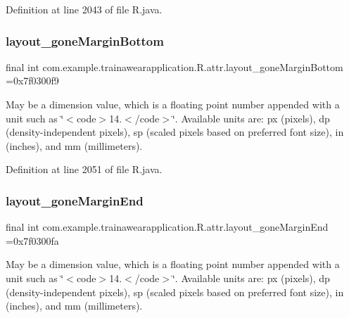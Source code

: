 Definition at line 2043 of file R.\+java.

\mbox{\label{classcom_1_1example_1_1trainawearapplication_1_1_r_1_1attr_af7ede1e194a5d45714927c5b07c3c7b1}} 
\subsubsection{\texorpdfstring{layout\_goneMarginBottom}{layout\_goneMarginBottom}}
{\footnotesize\ttfamily final int com.\+example.\+trainawearapplication.\+R.\+attr.\+layout\+\_\+gone\+Margin\+Bottom =0x7f0300f9\hspace{0.3cm}{\ttfamily [static]}}

May be a dimension value, which is a floating point number appended with a unit such as \char`\"{}$<$code$>$14.\+5sp$<$/code$>$\char`\"{}. Available units are\+: px (pixels), dp (density-\/independent pixels), sp (scaled pixels based on preferred font size), in (inches), and mm (millimeters). 

Definition at line 2051 of file R.\+java.

\mbox{\label{classcom_1_1example_1_1trainawearapplication_1_1_r_1_1attr_a74071c7b63cbbee66d73c874ad80cfe9}} 
\subsubsection{\texorpdfstring{layout\_goneMarginEnd}{layout\_goneMarginEnd}}
{\footnotesize\ttfamily final int com.\+example.\+trainawearapplication.\+R.\+attr.\+layout\+\_\+gone\+Margin\+End =0x7f0300fa\hspace{0.3cm}{\ttfamily [static]}}

May be a dimension value, which is a floating point number appended with a unit such as \char`\"{}$<$code$>$14.\+5sp$<$/code$>$\char`\"{}. Available units are\+: px (pixels), dp (density-\/independent pixels), sp (scaled pixels based on preferred font size), in (inches), and mm (millimeters). 

